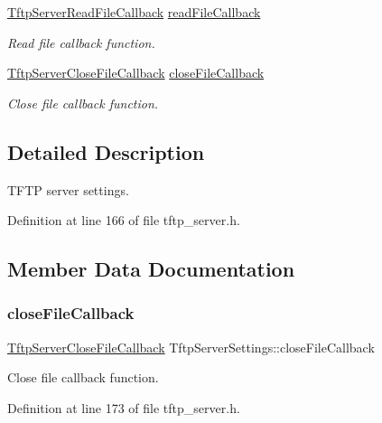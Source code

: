 \begin{DoxyCompactItemize}
\hyperlink{tftp__server_8h_afa6bd838b7892c537a693b49fd742435}{Tftp\+Server\+Read\+File\+Callback} \hyperlink{structTftpServerSettings_a19916ed7790a89b5faac2c3f70cd5600}{read\+File\+Callback}
\begin{DoxyCompactList}\small\item\em Read file callback function. \end{DoxyCompactList}\item 
\hyperlink{tftp__server_8h_ae527b4de8c8e0db74396ab57fbcb96a7}{Tftp\+Server\+Close\+File\+Callback} \hyperlink{structTftpServerSettings_a72dc05f03e3eb13f0250658c90c18e0f}{close\+File\+Callback}
\begin{DoxyCompactList}\small\item\em Close file callback function. \end{DoxyCompactList}\end{DoxyCompactItemize}


\subsection{Detailed Description}
T\+F\+TP server settings. 

Definition at line 166 of file tftp\+\_\+server.\+h.



\subsection{Member Data Documentation}
\mbox{\label{structTftpServerSettings_a72dc05f03e3eb13f0250658c90c18e0f}} 
\subsubsection{\texorpdfstring{close\+File\+Callback}{closeFileCallback}}
{\footnotesize\ttfamily \hyperlink{tftp__server_8h_ae527b4de8c8e0db74396ab57fbcb96a7}{Tftp\+Server\+Close\+File\+Callback} Tftp\+Server\+Settings\+::close\+File\+Callback}



Close file callback function. 



Definition at line 173 of file tftp\+\_\+server.\+h.

